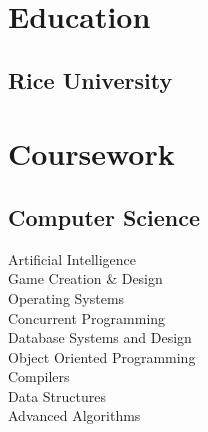 \documentclass[letterpaper]{deedy-resume-openfont} %
\begin{document}

\lastupdated %



\begin{minipage}[t]{0.29\textwidth} %


\section{Education} 

\subsection{Rice University}



\section{Coursework}

\subsection{Computer Science}
\textbullet{} Artificial Intelligence\\
\textbullet{} Game Creation \& Design\\
\textbullet{} Operating Systems\\
\textbullet{} Concurrent Programming\\
\textbullet{} Database Systems and Design\\
\textbullet{} Object Oriented Programming\\
\textbullet{} Compilers\\
\textbullet{} Data Structures\\
\textbullet{} Advanced Algorithms\\


\end{minipage}
\end{document}
